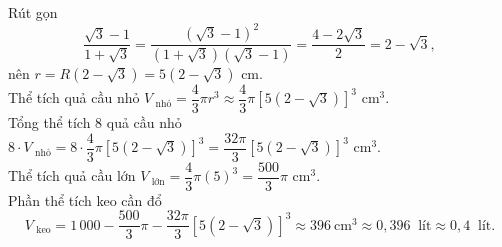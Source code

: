 \begin{bt}
{\begin{center}
		\end{center}
		Rút  gọn
		\[ 
		\dfrac{\sqrt{3}-1}{1+\sqrt{3}} = \dfrac{(\sqrt{3}-1)^2}{(1+\sqrt{3})(\sqrt{3}-1)} =  \dfrac{4-2\sqrt{3}}{2} = 2-\sqrt{3},
		 \]
		nên $r = R(2-\sqrt{3})=  5(2-\sqrt{3})$ cm.\\
		Thể tích quả cầu nhỏ $V_{\text{ nhỏ}} = \dfrac{4}{3}\pi r^3 \approx  \dfrac{4}{3}\pi\left[5(2-\sqrt{3})\right]^3$ cm$^3$.\\
		Tổng thể tích $8$ quả  cầu nhỏ
		$8\cdot V_{\text{ nhỏ}} = 8\cdot \dfrac{4}{3}\pi\left[5(2-\sqrt{3})\right]^3=\dfrac{32\pi}{3}\left[5(2-\sqrt{3})\right]^3$  cm$^3$.\\
		Thể tích quả cầu lớn $V_{\text{ lớn}} = \dfrac{4}{3}\pi(5)^3 = \dfrac{500}{3}\pi $ cm$^3$.\\ 
		Phần thể tích keo cần  đổ
		 \[
		V_{\text{ keo}} = 1\,000 - \dfrac{500}{3}\pi- \dfrac{32\pi}{3}\left[5(2-\sqrt{3})\right]^3 \approx 396\ \mathrm{cm}^3 \approx 0{,}396\ \text{ lít}  \approx 0{,}4\ \text{ lít}.
		 \]
	} 
\end{bt}

